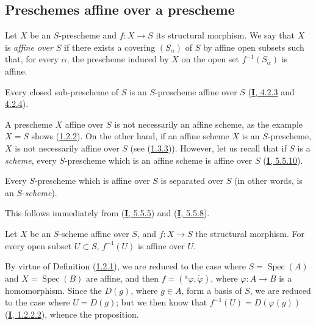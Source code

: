 \subsection{Preschemes affine over a prescheme}
\label{subsection:II.1.2}

\begin{definition}[1.2.1]
\label{II.1.2.1}
Let $X$ be an $S$-prescheme and $f:X\to S$ its structural morphism. We say
that $X$ is \emph{affine over $S$} if there exists a covering
$(S_\alpha)$ of $S$ by affine open subsets such that, for every $\alpha$, the
prescheme induced by $X$ on the open set $f^{-1}(S_\alpha)$ is affine.
\end{definition}

\begin{example}[1.2.2]
\label{II.1.2.2}
Every closed sub-prescheme of $S$ is an $S$-prescheme affine over $S$
(\hyperref[I.4.2.3]{\textbf{I}, 4.2.3} and
\hyperref[I.4.2.4]{4.2.4}).
\end{example}

\begin{remark}[1.2.3]
\label{II.1.2.3}
A prescheme $X$ affine over $S$ is not necessarily an affine scheme,
as the example $X=S$ shows (\hyperref[II.1.2.2]{1.2.2}).
On the other hand, if an affine scheme $X$ is an $S$-prescheme, $X$ is not
necessarily affine over
$S$ (see (\hyperref[II.1.3.3]{1.3.3})). However, let us recall that if
$S$ is a \emph{scheme}, every $S$-prescheme which is an affine scheme is
affine over $S$ (\hyperref[I.5.5.10]{\textbf{I}, 5.5.10}).
\end{remark}

\begin{proposition}[1.2.4]
\label{II.1.2.4}
Every $S$-prescheme which is affine over $S$ is separated over
$S$ \textup{(in other words, is an $S$-\emph{scheme})}.
\end{proposition}

This follows immediately from (\hyperref[I.5.5.5]{\textbf{I}, 5.5.5}) and
(\hyperref[I.5.5.8]{\textbf{I}, 5.5.8}).

\begin{proposition}[1.2.5]
\label{II.1.2.5}
Let $X$ be an $S$-scheme affine over $S$, and $f:X\to S$ the structural
morphism. For every open subset $U\subset S$, $f^{-1}(U)$ is affine over
$U$.
\end{proposition}

By virtue of Definition (\hyperref[II.1.2.1]{1.2.1}), we are reduced to the
case where $S=\operatorname{Spec}(A)$ and $X=\operatorname{Spec}(B)$ are
affine, and then $f=({}^a\varphi,\widetilde{\varphi})$, where
$\varphi:A\to B$ is a homomorphism. Since the $D(g)$, where $g\in A$, form a
basis of $S$, we are reduced to the case where $U=D(g)$; but we then know
that $f^{-1}(U)=D(\varphi(g))$ (\hyperref[I.1.2.2.2]{\textbf{I}, 1.2.2.2}), whence
the proposition.

